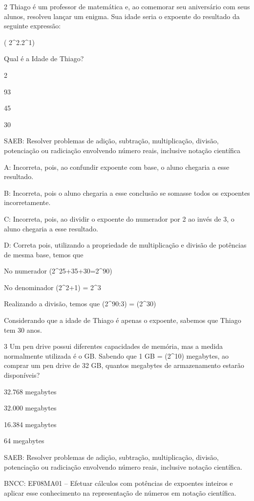 \num{2} Thiago é um professor de matemática e, ao comemorar seu aniversário
com seus alunos, resolveu lançar um enigma. Sua idade seria o expoente
do resultado da seguinte expressão:

( {2^2.2^1})

Qual é a Idade de Thiago?
\item 2
\item 93
\item 45
\item 30

SAEB: Resolver problemas de adição, subtração, multiplicação, divisão,
potenciação ou radiciação envolvendo número reais, inclusive notação
científica

A: Incorreta, pois, ao confundir expoente com base, o aluno chegaria a
esse resultado.

B: Incorreta, pois o aluno chegaria a esse conclusão se somasse todos os
expoentes incorretamente.

C: Incorreta, pois, ao dividir o expoente do numerador por 2 ao invés de
3, o aluno chegaria a esse resultado.

D: Correta pois, utilizando a propriedade de multiplicação e divisão de
potências de mesma base, temos que

No numerador (2^{25+35+30}=2^{90})

No denominador (2^{2+1}) = 2^3

Realizando a divisão, temos que (2^{90}:3) = (2^{30})

Considerando que a idade de Thiago é apenas o expoente, sabemos que
Thiago tem 30 anos.

\num{3} Um pen drive possui diferentes capacidades de memória, mas a medida
normalmente utilizada é o GB. Sabendo que 1 GB = (2^{10}) megabytes,
ao comprar um pen drive de 32 GB, quantos megabytes de armazenamento
estarão disponíveis?
\item 32.768 megabytes
\item 32.000 megabytes
\item 16.384 megabytes
\item 64 megabytes

SAEB: Resolver problemas de adição, subtração, multiplicação, divisão,
potenciação ou radiciação envolvendo número reais, inclusive notação
científica.

BNCC: EF08MA01 -- Efetuar cálculos com potências de expoentes inteiros e
aplicar esse conhecimento na representação de números em notação
científica.

